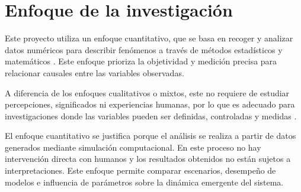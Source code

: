 \section{Enfoque de la investigación}

Este proyecto utiliza un enfoque cuantitativo, que se basa en recoger y analizar datos numéricos para describir fenómenos a través de métodos estadísticos y matemáticos \cite{cuantitativa}. Este enfoque prioriza la objetividad y medición precisa para relacionar causales entre las variables observadas.

A diferencia de los enfoques cualitativos o mixtos, este no requiere de estudiar percepciones, significados ni experiencias humanas, por lo que es adecuado para investigaciones donde las variables pueden ser definidas, controladas y medidas \cite{mixto}.

El enfoque cuantitativo se justifica porque el análisis se realiza a partir de datos generados mediante simulación computacional. En este proceso no hay intervención directa con humanos y los resultados obtenidos no están sujetos a interpretaciones. Este enfoque permite comparar escenarios, desempeño de modelos e influencia de parámetros sobre la dinámica emergente del sistema.

